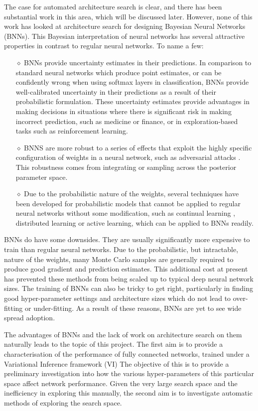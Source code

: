 The case for automated architecture search is clear, and there has been substantial work in this area, which will be discussed later. However, none of this work has looked at architecture search for designing Bayesian Neural Networks (BNNs). This Bayesian interpretation of neural networks has several attractive properties in contrast to regular neural networks. To name a few:
\begin{itemize}
	\item[\( \diamond \)] BNNs provide uncertainty estimates in their predictions. In comparison to standard neural networks which produce point estimates, or can be confidently wrong when using softmax layers in classification, BNNs provide well-calibrated uncertainty in their predictions as a result of their probabilistic formulation. These uncertainty estimates provide advantages in making decisions in situations where there is significant risk in making incorrect prediction, such as medicine or finance, or in exploration-based tasks such as reinforcement learning. 
	\item[\( \diamond \)] BNNS are more robust to a series of effects that exploit the highly specific configuration of weights in a neural network, such as adversarial attacks  \citep{Liu2018}. This robustness comes from integrating or sampling across the posterior parameter space.
	\item[\( \diamond \)] Due to the probabilistic nature of the weights, several techniques have been developed for probabilistic models that cannot be applied to regular neural networks without some modification, such as continual learning \citep{Swaroop2019}, distributed learning \citep{Bui} or active learning, which can be applied to BNNs readily.
\end{itemize}

BNNs do have some downsides. They are usually significantly more expensive to train than regular neural networks. Due to the probabilistic, but intractable, nature of the weights, many Monte Carlo samples are generally required to produce good gradient and prediction estimates. This additional cost at present has prevented these methods from being scaled up to typical deep neural network sizes. The training of BNNs can also be tricky to get right, particularly in finding good hyper-parameter settings and architecture sizes which do not lead to over-fitting or under-fitting. As a result of these reasons, BNNs are yet to see wide spread adoption. 

The advantages of BNNs and the lack of work on architecture search on them naturally leads to the topic of this project. The first aim is to provide a characterisation of the performance of fully connected networks, trained under a Variational Inference framework (VI)  The objective of this is to provide a preliminary investigation into how the various hyper-parameters of this particular space affect network performance. Given the very large search space and the inefficiency in exploring this manually, the second aim is to investigate automatic methods of exploring the search space.